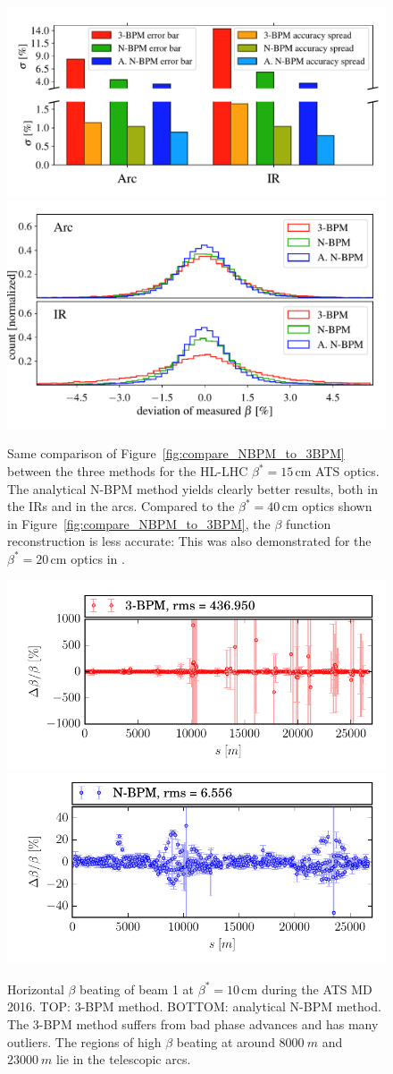 \begin{figure}
	\centering
  \includegraphics[width=.49\linewidth]{comparison_statistics_HL007_bars}
    \includegraphics[width=.49\linewidth]{comparison_statistics_HL006}
	
	\caption{
        Same comparison of Figure~\ref{fig:compare_NBPM_to_3BPM} between the three methods for the
        HL-LHC $ \beta^*= 15\,\text{cm} $ ATS optics. The analytical N-BPM method yields clearly
        better results, both in the IRs and in the arcs. Compared to the $ \beta^*=40\,\text{cm} $
        optics shown in Figure~\ref{fig:compare_NBPM_to_3BPM}, the $ \beta $ function reconstruction
        is less accurate: This was also demonstrated for the $ \beta^*=20\,\text{cm} $ optics in
        \cite{LangnerNBPM}. }
	\label{fig:compare_ATS}
\end{figure}



\begin{figure}
	\centering
  \includegraphics[width=.7\linewidth]{10cm_b1_x_3bpm}
    \includegraphics[width=.7\linewidth]{10cm_b1_x_nbpm}
	\caption{Horizontal $ \beta $ beating of beam 1 at $ \beta^*=10\,\text{cm} $ during the ATS MD 2016. TOP: 3-BPM method. BOTTOM: analytical N-BPM method. The 3-BPM method suffers from bad phase advances and has many outliers. The regions of high $ \beta $ beating at around $ \SI{8000}{m} $ and $ \SI{23000}{m} $ lie in the telescopic arcs. }
	\label{fig:10cm_beam1_hor_3bpm}
\end{figure}



